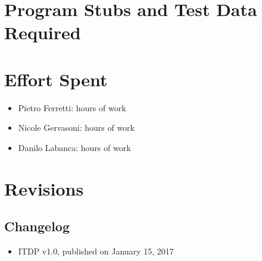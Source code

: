 \documentclass[english]{article}
\begin{document}
\section{Program Stubs and Test Data Required}


\section{Effort Spent}
\begin{itemize}
	\item{Pietro Ferretti:  hours of work}
	\item{Nicole Gervasoni:  hours of work}
	\item{Danilo Labanca:  hours of work}
\end{itemize}


\section{Revisions}

\subsection{Changelog}
\begin{itemize}
	\item{ITDP v1.0, published on January 15, 2017}
\end{itemize}
\end{document}
